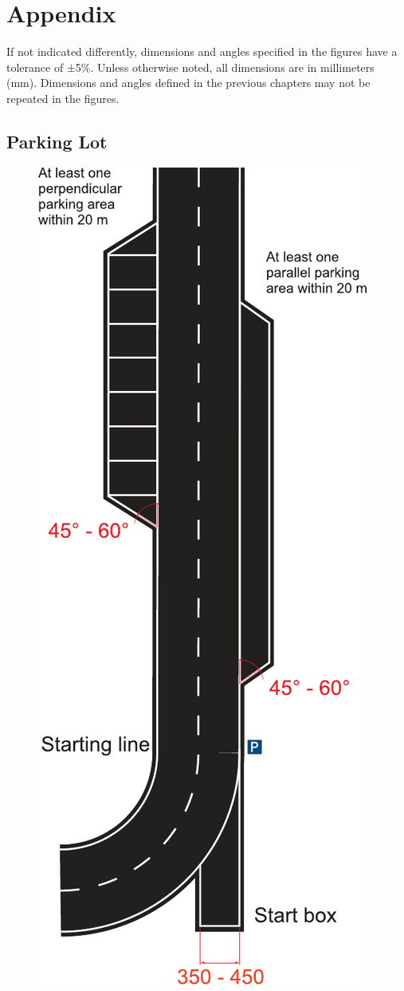 \appendix
\chapter{Appendix}
If not indicated differently, dimensions and angles specified in the figures
have a tolerance of ±5\%. Unless otherwise noted, all dimensions are in
millimeters (mm). Dimensions and angles defined in the previous chapters may
not be repeated in the figures.

\section{Parking Lot}
\label{fig_parking_lot}
\begin{figure}[H]
	\begin{center}
		\centering\includegraphics[scale=0.8]{graphics/Abb_1_parking_lot}

\end{center}
\end{figure}
